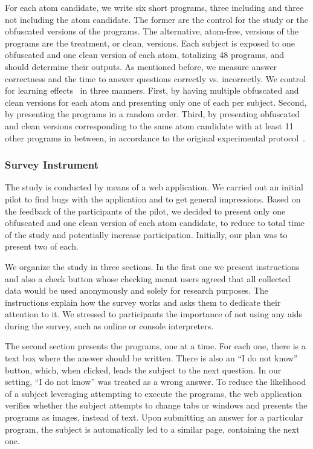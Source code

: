 For each atom candidate, we write six short programs, three including and three not including the atom candidate. The former are the control for the study or the obfuscated versions of the programs. The alternative, atom-free, versions of the programs are the treatment, or clean, versions. Each subject is exposed to one obfuscated and one clean version of each atom, totalizing 48 programs, and should determine their outputs. As mentioned before, we measure answer correctness and the time to answer questions correctly vs. incorrectly. We control for learning effects~\cite{Neely:1991:SPE} in three manners. First, by having multiple obfuscated and clean versions for each atom and presenting only one of each per subject. Second, by presenting the programs in a random order. Third, by presenting obfuscated and clean versions corresponding to the same atom candidate with at least 11 other programs in between, in  accordance to the original experimental protocol~\cite{GopsteinIYDZYC17}. 

\subsubsection*{Survey Instrument} 

The study is conducted by means of a web application. We carried out an initial pilot to find bugs with the application and to get general impressions. Based on the feedback of the participants of the pilot, we decided to present only one obfuscated and one clean version of each atom candidate, to reduce to total time of the study and potentially increase participation. Initially, our plan was to present two of each. 

We organize the study in three sections. In the first one we present instructions and also a check button whose checking meant users agreed that all collected data would be used anonymously and solely for research purposes. The instructions explain how the survey works and asks them to dedicate their attention to it.  We stressed to participants the importance of not using any aids during the survey, such as online or console interpreters. 

The second section presents the programs, one at a time. For each one, there is a text box where the answer should be written. There is also an ``I do not know'' button, which, when clicked, leads the subject to the next question. In our setting, ``I do not know'' was treated as a wrong answer. To reduce the likelihood of a subject leveraging attempting to execute the programs, the web application verifies whether the subject attempts to change tabs or windows and presents the programs as images, instead of text. Upon submitting an answer for a particular program, the subject is automatically led to a similar page, containing the next one.

